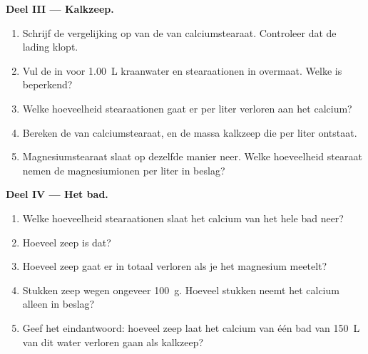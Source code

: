 \begin{problem}
\medskip
\noindent\textbf{Deel III --- Kalkzeep.}
\begin{enumerate}[resume]
  \item Schrijf de vergelijking op van de  van
        calciumstearaat. Controleer dat de lading klopt.
  \item Vul de  in voor \qty{1.00}{L} kraanwater en
        stearaationen in overmaat. Welke  is beperkend?
  \item Welke hoeveelheid stearaationen gaat er per liter verloren aan
        het calcium?
  \item Bereken de  van calciumstearaat, en de massa
        kalkzeep die per liter ontstaat.
  \item Magnesiumstearaat slaat op dezelfde manier neer. Welke
        hoeveelheid stearaat nemen de magnesiumionen per liter in beslag?
\end{enumerate}

\medskip
\noindent\textbf{Deel IV --- Het bad.}
\begin{enumerate}[resume]
  \item Welke hoeveelheid stearaationen slaat het calcium van het hele bad
        neer?
  \item Hoeveel zeep is dat?
  \item Hoeveel zeep gaat er in totaal verloren als je het magnesium
        meetelt?
  \item Stukken zeep wegen ongeveer \qty{100}{g}. Hoeveel stukken neemt
        het calcium alleen in beslag?
  \item Geef het eindantwoord: hoeveel zeep laat het calcium van één bad
        van \qty{150}{L} van dit water verloren gaan als kalkzeep?
\end{enumerate}
\end{problem}
